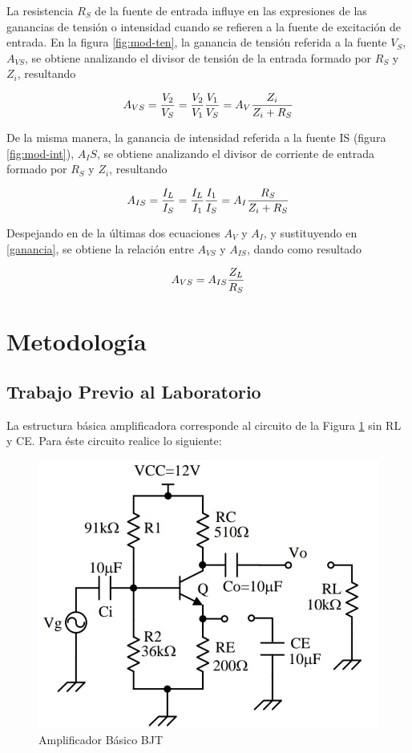 \documentclass[10pt, a4paper]{article}
\begin{document}
    La resistencia $R_S$ de la fuente de entrada influye en las expresiones de las ganancias de tensión o intensidad cuando se refieren a la fuente de excitación de entrada. En la figura \ref{fig:mod-ten}, la ganancia de tensión referida a la fuente $V_S$, $A_{VS}$, se obtiene analizando el divisor de tensión de la entrada formado por $R_S$ y $Z_i$, resultando

    $$A_{VS} = {V_2 \over V_S} = {V_2 \over V_1}{V_1 \over V_S} = A_V \frac{Z_i}{Z_i + R_S}$$

    De la misma manera, la ganancia de intensidad referida a la fuente IS (figura \ref{fig:mod-int}), $A_IS$, se obtiene analizando el divisor de corriente de entrada formado por $R_S$ y $Z_i$, resultando

    $$A_{IS} = {I_L \over I_S} = {I_L \over I_1}{I_1 \over I_S} = A_I \frac{R_S}{Z_i + R_S}$$

    Despejando en de la últimas dos ecuaciones $A_V$ y $A_I$, y sustituyendo en \ref{ganancia}, se obtiene la relación entre $A_{VS}$ y $A_{IS}$, dando como resultado

    $$A_{VS} = A_{IS}{Z_L \over R_S}$$

    \newpage

    \section{Metodología}

    \subsection{Trabajo Previo al Laboratorio}

    La estructura básica amplificadora corresponde al circuito de la Figura \ref{fig:circuito} sin RL y CE. Para éste circuito realice lo siguiente:

    \begin{figure}[h!]
        \centering
        \includegraphics[height=4cm\textwidth]{amplificadorbjt.jpg}
        \caption{Amplificador Básico BJT}
        \label{fig:circuito}
    \end{figure}
\end{document}
